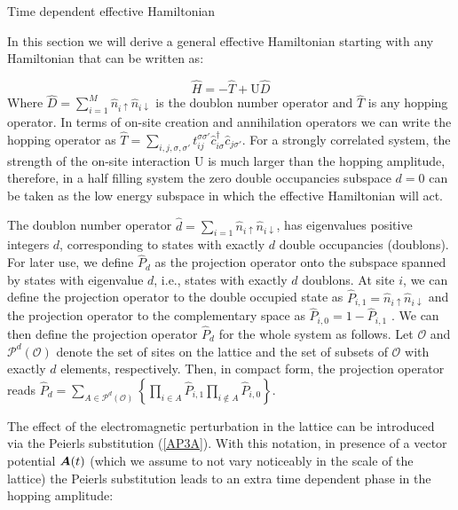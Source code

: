 \begin{section}{Time dependent effective Hamiltonian}
\label{SectionTDHeff}

In this section we will derive a general effective Hamiltonian starting with any Hamiltonian that can be written as:

\begin{equation}
\hat{H} = -\hat{T} + \text{U}\hat{D}
\end{equation}
Where $\hat{D} = \sum_{i=1}^M \hat{n}_{i\uparrow}\hat{n}_{i\downarrow}$ is the doublon number operator and $\hat{T}$ is any hopping operator. In terms of on-site creation and annihilation operators we can write the hopping operator as $\hat{T} = \sum_{i,j, \sigma, \sigma'} t_{ij}^{\sigma \sigma'} \hat{c}_{i \sigma}^\dagger \hat{c}_{j \sigma'}$. For a strongly correlated system, the strength of the on-site interaction $\text{U}$ is much larger than the hopping amplitude, therefore, in a half filling system the zero double occupancies subspace $d=0$ can be taken as the low energy subspace in which the effective Hamiltonian will act. 

The doublon number operator $\hat{d} = \sum_{i=1} \hat{n}_{i\uparrow}\hat{n}_{i\downarrow}$, has eigenvalues positive integers $d$, corresponding to states with exactly $d$ double occupancies (doublons). For later use, we define $\hat{P}_d$ as the projection operator onto the subspace spanned by states with eigenvalue $d$, i.e., states with exactly $d$ doublons. At site $i$, we can define the projection operator to the double occupied state as $\hat{P}_{i,1} = \hat{n}_{i\uparrow}\hat{n}_{i\downarrow}$ and the projection operator to the complementary space as $\hat{P}_{i,0} = 1 - \hat{P}_{i,1}$ \cite{Fazekas}. We can then define the projection operator $\hat{P}_{d}$ for the whole system as follows. Let $\mathcal{O}$ and $\mathcal{P}^d(\mathcal{O})$ denote the set of sites on the lattice and the set of subsets of $\mathcal{O}$ with exactly $d$ elements, respectively. Then, in compact form, the projection operator reads $\hat{P}_d = \sum_{A \in \mathcal{P}^d(\mathcal{O})} \left\{\prod_{i \in A} \hat{P}_{i,1} \prod_{i \notin A} \hat{P}_{i,0} \right\}$.

The effect of the electromagnetic perturbation in the lattice can be introduced via the Peierls substitution (\ref{AP3A}). With this notation, in presence of a vector potential $\boldsymbol{A}(t)$ (which we assume to not vary noticeably in the scale of the lattice) the Peierls substitution leads to an extra time dependent phase in the hopping amplitude:


\end{section}
